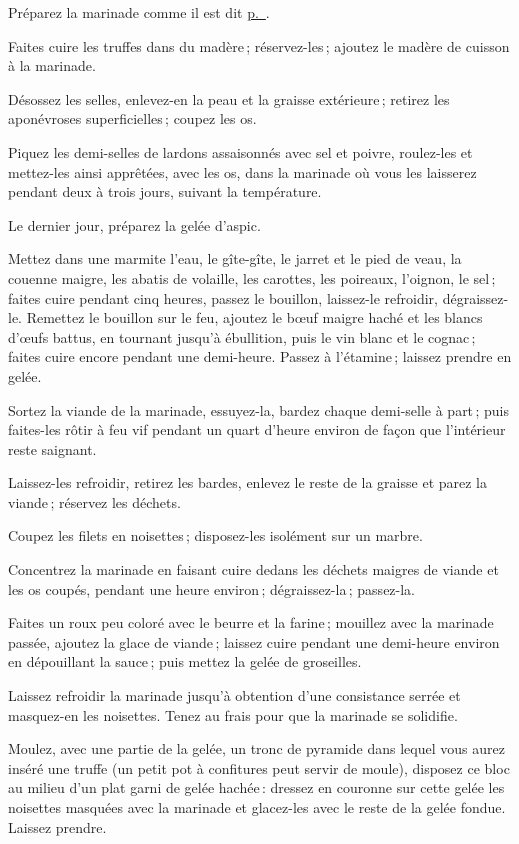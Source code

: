 \medskip

Préparez la marinade comme il est dit \hyperlink{p0514}{p. \pageref{pg0514}}.

Faites cuire les truffes dans du madère ; réservez-les ; ajoutez le madère de
cuisson à la marinade.

Désossez les selles, enlevez-en la peau et la graisse extérieure ; retirez les
aponévroses superficielles ; coupez les os.

Piquez les demi-selles de lardons assaisonnés avec sel et poivre, roulez-les et
mettez-les ainsi apprêtées, avec les os, dans la marinade où vous les laisserez
pendant deux à trois jours, suivant la température.

Le dernier jour, préparez la gelée d'aspic.

Mettez dans une marmite l'eau, le gîte-gîte, le jarret et le pied de veau, la
couenne maigre, les abatis de volaille, les carottes, les poireaux, l'oignon,
le sel ; faites cuire pendant cinq heures, passez le bouillon, laissez-le
refroidir, dégraissez- le. Remettez le bouillon sur le feu, ajoutez le bœuf
maigre haché et les blancs d'œufs battus, en tournant jusqu'à ébullition, puis
le vin blanc et le cognac ; faites cuire encore pendant une demi-heure. Passez
à l'étamine ; laissez prendre en gelée.

Sortez la viande de la marinade, essuyez-la, bardez chaque demi-selle à part ;
puis faites-les rôtir à feu vif pendant un quart d'heure environ de façon que
l'intérieur reste saignant.

Laissez-les refroidir, retirez les bardes, enlevez le reste de la graisse et
parez la viande ; réservez les déchets.

Coupez les filets en noisettes ; disposez-les isolément sur un marbre.

Concentrez la marinade en faisant cuire dedans les déchets maigres de viande et
les os coupés, pendant une heure environ ; dégraissez-la ; passez-la.

Faites un roux peu coloré avec le beurre et la farine ; mouillez avec la
marinade passée, ajoutez la glace de viande ; laissez cuire pendant une
demi-heure environ en dépouillant la sauce ; puis mettez la gelée de
groseilles.

Laissez refroidir la marinade jusqu'à obtention d'une consistance serrée et
masquez-en les noisettes. Tenez au frais pour que la marinade se solidifie.

Moulez, avec une partie de la gelée, un tronc de pyramide dans lequel vous
aurez inséré une truffe (un petit pot à confitures peut servir de moule),
disposez ce bloc au milieu d'un plat garni de gelée hachée : dressez en
couronne sur cette gelée les noisettes masquées avec la marinade et glacez-les
avec le reste de la gelée fondue. Laissez prendre.

